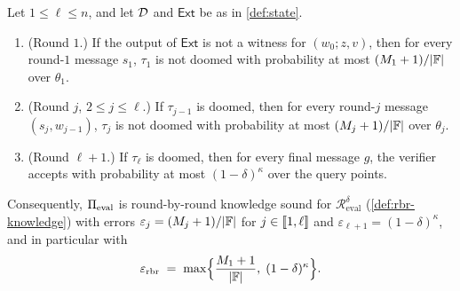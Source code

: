 \begin{theorem}\label{thm:rbr}
Let $1 \le \ell \le n$, and let $\mathcal{D}$ and $\mathsf{Ext}$ be as in \cref{def:state}.
\begin{enumerate}
  \item (Round $1$.) If the output of $\mathsf{Ext}$ is not a witness for $(w_0; z,v)$, then for every round-$1$ message $s_1$, $\tau_1$ is not doomed with probability at most $(M_1 + 1)/|\mathbb{F}|$ over $\theta_1$.
  \item (Round $j$, $2 \le j \le \ell$.) If $\tau_{j-1}$ is doomed, then for every round-$j$ message $(s_j, w_{j-1})$, $\tau_j$ is not doomed with probability at most $(M_j+1)/|\mathbb{F}|$ over $\theta_j$.
  \item (Round $\ell+1$.) If $\tau_\ell$ is doomed, then for every final message $g$, the verifier accepts with probability at most $(1-\delta)^{\kappa}$ over the query points.
\end{enumerate}
Consequently, $\Pi_{\mathrm{eval}}$ is round-by-round knowledge sound for $\mathcal{R}^{\delta}_{\mathrm{eval}}$ (\cref{def:rbr-knowledge}) with errors $\varepsilon_j = (M_j+1)/|\mathbb{F}|$ for $j \in \llbracket 1, \ell \rrbracket$ and $\varepsilon_{\ell+1} = (1-\delta)^\kappa$, and in particular with
\[
  \varepsilon_{\mathrm{rbr}} \;=\; \max\Bigl\{ \frac{M_1 + 1}{|\mathbb{F}|},\; (1-\delta)^{\kappa} \Bigr\}.
\]
\end{theorem}

